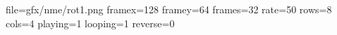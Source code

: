 file=gfx/nme/rot1.png
framex=128
framey=64
frames=32
rate=50
rows=8
cols=4
playing=1
looping=1
reverse=0
